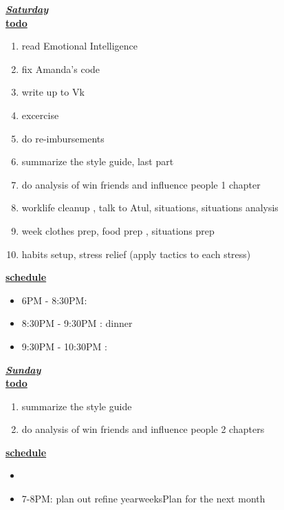 \underline{\textbf{\textit{Saturday}}}\\
\underline{\textbf{todo}}\\
\begin{enumerate}
\item read Emotional Intelligence 
\item fix Amanda's code 
\item write up to Vk 
\item excercise
\item do re-imbursements
\item summarize the style guide, last part 

\item do analysis of win friends and influence people 1 chapter 
\item worklife cleanup , talk to Atul, situations, situations  analysis

 \item week clothes prep, food prep , situations prep
\item habits setup, stress relief (apply tactics to each stress)  

\end{enumerate}

\underline{\textbf{schedule}}\\
\begin{itemize}
\situationItem 12PM - 1PM:
\item 6PM - 8:30PM:
\item 8:30PM - 9:30PM : dinner
\item 9:30PM - 10:30PM :
\end{itemize}

\underline{\textbf{\textit{Sunday}}}\\
\underline{\textbf{todo}}\\
\begin{enumerate}
\item summarize the style guide 
\item do analysis of win friends and influence people 2 chapters 
\end{enumerate}

\underline{\textbf{schedule}}\\
\begin{itemize}
\item
\item 7-8PM: plan out refine yearweeksPlan for the next month
\end{itemize}

\newpage

